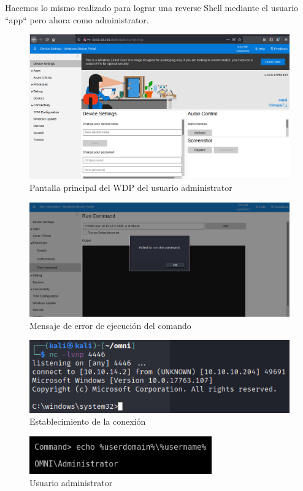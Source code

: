 \documentclass{article}
\begin{document}
Hacemos lo mismo realizado para lograr una reverse Shell mediante el usuario “app“ pero ahora como administrator.
\begin{figure}[H]
	\center
	\includegraphics[width=\textwidth]{images/omni/28.png}
	\caption{Pantalla principal del WDP del usuario administrator}
\end{figure}
\begin{figure}[H]
	\center
	\includegraphics[width=\textwidth]{images/omni/29.png}
	\caption{Mensaje de error de ejecución del comando}
\end{figure}
\begin{figure}[H]
	\center
	\includegraphics[width=\textwidth]{images/omni/30.png}
	\caption{Establecimiento de la conexión}
\end{figure}
\begin{figure}[H]
	\center
	\includegraphics[width=0.7\textwidth]{images/omni/31.png}
	\caption{Usuario administrator}
\end{figure}
\end{document}

